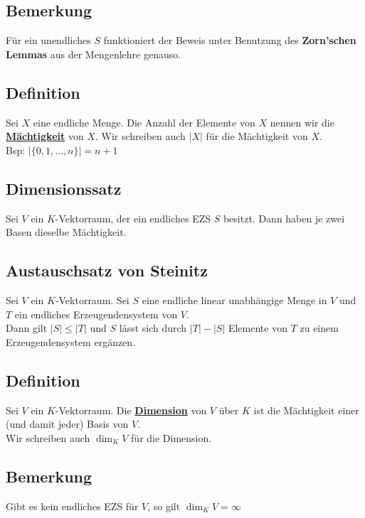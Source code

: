 \subsection{Bemerkung} %
\label{sub:bemerkung}
Für ein unendliches $S$ funktioniert der Beweis unter Benutzung des \textbf{Zorn'schen Lemmas} aus der Mengenlehre genauso.

\subsection{Definition} %
\label{sub:definition}
Sei $X$ eine endliche Menge. Die Anzahl der Elemente von $X$ nennen wir die \underline{\textbf{Mächtigkeit}} von $X$. Wir schreiben auch $|X|$ für die Mächtigkeit von $X$. 
\vspace{\baselineskip} \\
Bsp: $\left| \{0,1, \ldots , n\} \right| =n+1$

\subsection{Dimensionssatz} %
\label{sub:dimensionssatz}
Sei $V$ ein $K$-Vektorraum, der ein endliches EZS $S$ besitzt. Dann haben je zwei Basen dieselbe Mächtigkeit.

\subsection{Austauschsatz von Steinitz} %
\label{sub:dimensionssatz}
Sei $V$ ein $K$-Vektorraum. Sei $S$ eine endliche linear unabhängige Menge in $V$ und $T$ ein endliches Erzeugendensystem von $V$. \\
Dann gilt $|S| \leq |T|$ und $S$ lässt sich durch $|T| - |S|$ Elemente von $T$ zu einem Erzeugendensystem ergänzen.

\subsection{Definition} %
\label{sub:definition}
Sei $V$ ein $K$-Vektorraum. Die \underline{\textbf{Dimension}} von $V$ über $K$ ist die Mächtigkeit einer (und damit jeder) Basis von $V$. \\
Wir schreiben auch $\dim_K V$ für die Dimension.

\subsection{Bemerkung} %
\label{sub:bemerkung}
Gibt es kein endliches EZS für $V$, so gilt
$\dim_K V = \infty$

